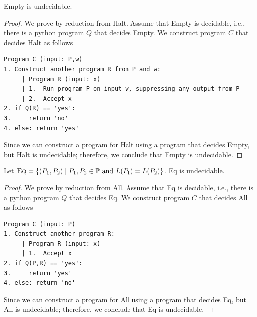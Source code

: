 \begin{frame}[fragile=true]
  \begin{lemma}
    {\sc Empty} is undecidable.
  \end{lemma}
  \begin{proof}
    {\small
      
    We prove by reduction from {\sc Halt}.  Assume that {\sc Empty} is
    decidable, i.e., there is a python program $Q$ that decides {\sc
      Empty}.  We construct program $C$ that decides {\sc Halt} as
    follows

    {\footnotesize
\begin{verbatim}
Program C (input: P,w)
1. Construct another program R from P and w:
     | Program R (input: x)
     | 1.  Run program P on input w, suppressing any output from P
     | 2.  Accept x
2. if Q(R) == 'yes':
3.     return 'no'
4. else: return 'yes'
\end{verbatim}
    }

    Since we can construct a program for {\sc Halt} using a program
    that decides {\sc Empty}, but {\sc Halt} is undecidable;
    therefore, we conclude that {\sc Empty} is undecidable.
    }
  \end{proof}
\end{frame}

\begin{frame}[fragile=true]
  \begin{lemma}
    Let $\textsc{Eq} = \{(P_1,P_2) \;|\;
    \mbox{$P_1,P_2\in{\mathbb P}$ and $L(P_1)=L(P_2)$}\}$.
    {\sc Eq} is undecidable.
  \end{lemma}
  \begin{proof}
    {\small
      
    We prove by reduction from {\sc All}.  Assume that {\sc Eq} is
    decidable, i.e., there is a python program $Q$ that decides {\sc
      Eq}.  We construct program $C$ that decides {\sc All} as
    follows

    {\footnotesize
\begin{verbatim}
Program C (input: P)
1. Construct another program R:
     | Program R (input: x)
     | 1.  Accept x
2. if Q(P,R) == 'yes':
3.     return 'yes'
4. else: return 'no'
\end{verbatim}
    }

    Since we can construct a program for {\sc All} using a program
    that decides {\sc Eq}, but {\sc All} is undecidable;
    therefore, we conclude that {\sc Eq} is undecidable.
    }
  \end{proof}
\end{frame}


